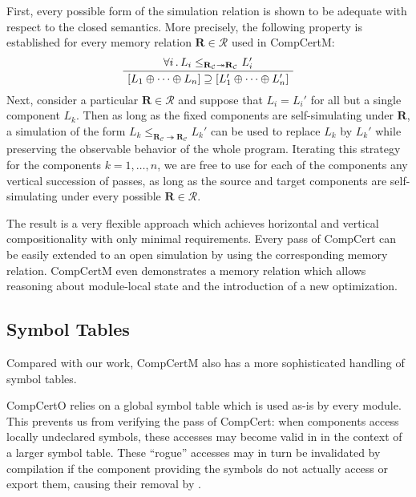 \documentclass[sigplan,screen]{acmart}
\newenvironment{optional}{}{}
\begin{document}
\begin{optional}
First,
every possible form of the simulation relation
is shown to be adequate with respect to the closed semantics.
More precisely,
the following property is established
for every memory relation $\mathbf{R} \in \mathcal{R}$
used in CompCertM:
\begin{equation} \label{eqn:simadeq}
  \AxiomC{$\forall i \,.\,
    L_i \le_{\mathbf{R}_\mathcal{C} \twoheadrightarrow
             \mathbf{R}_\mathcal{C}} L_i'$}
  \UnaryInfC{$
    [L_1  \oplus \cdots \oplus L_n] \supseteq
    [L_1' \oplus \cdots \oplus L_n']$}
  \DisplayProof
\end{equation}
Next,
consider a particular $\mathbf{R} \in \mathcal{R}$
and suppose that $L_i = L_i'$
for all but a single component $L_k$.
Then
as long as the fixed components are self-simulating under $\mathbf{R}$,
a simulation of the form
$L_k \le_{\mathbf{R}_\mathcal{C} \twoheadrightarrow
	  \mathbf{R}_\mathcal{C}} L_k'$
can be used to replace $L_k$ by $L_k'$
while preserving the observable behavior of the whole program.
Iterating this strategy for the components $k = 1, \ldots, n$,
we are free to use for each of the components
any vertical succession of passes,
as long as the source and target components
are self-simulating under every possible $\mathbf{R} \in \mathcal{R}$.

The result is a very flexible approach
which achieves horizontal and vertical compositionality
with only minimal requirements.
Every pass of CompCert can be easily
extended to an open simulation
by using the corresponding memory relation.
CompCertM even demonstrates
a memory relation
which allows reasoning about module-local state
and the introduction of a new  optimization.


\subsection{Symbol Tables} %

Compared with our work,
CompCertM also has a more sophisticated handling
of symbol tables.

CompCertO relies on a global symbol table
which is used as-is by every module.
This prevents us
from verifying the  pass of CompCert:
when components access locally undeclared symbols,
these accesses may become valid in
in the context of a larger symbol table.
These ``rogue'' accesses may in turn be invalidated by compilation
if the component providing the symbols
do not actually access or export them,
causing their removal by .


\end{optional}
\end{document}
